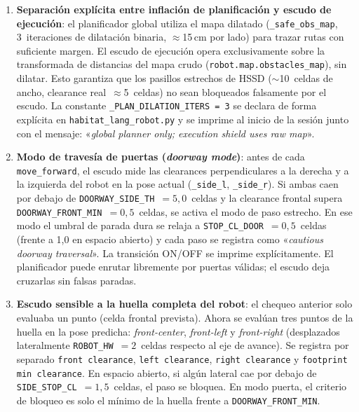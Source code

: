 \begin{enumerate}

  \item \textbf{Separación explícita entre inflación de planificación y escudo
        de ejecución}: el planificador global utiliza el mapa dilatado
        (\texttt{\_safe\_obs\_map}, 3~iteraciones de dilatación binaria,
        $\approx$15\,cm por lado) para trazar rutas con suficiente margen.
        El escudo de ejecución opera exclusivamente sobre la transformada de
        distancias del mapa crudo (\texttt{robot.map.obstacles\_map}), sin
        dilatar. Esto garantiza que los pasillos estrechos de HSSD
        ($\sim$10~celdas de ancho, clearance real~$\approx$5~celdas) no sean
        bloqueados falsamente por el escudo. La constante
        \texttt{\_PLAN\_DILATION\_ITERS = 3} se declara de forma explícita en
        \texttt{habitat\_lang\_robot.py} y se imprime al inicio de la sesión
        junto con el mensaje: «\textit{global planner only; execution shield
        uses raw map}».

  \item \textbf{Modo de travesía de puertas (\textit{doorway mode})}: antes de
        cada \texttt{move\_forward}, el escudo mide las clearances
        perpendiculares a la derecha y a la izquierda del robot en la pose
        actual (\texttt{\_side\_l}, \texttt{\_side\_r}). Si ambas caen por
        debajo de \texttt{DOORWAY\_SIDE\_TH}~$= 5{,}0$~celdas y la clearance
        frontal supera \texttt{DOORWAY\_FRONT\_MIN}~$= 0{,}5$~celdas, se
        activa el modo de paso estrecho. En ese modo el umbral de parada dura
        se relaja a \texttt{STOP\_CL\_DOOR}~$= 0{,}5$~celdas (frente a
        1{,}0 en espacio abierto) y cada paso se registra como
        «\textit{cautious doorway traversal}». La transición
        ON/OFF se imprime explícitamente. El planificador puede enrutar
        libremente por puertas válidas; el escudo deja cruzarlas sin falsas
        paradas.

  \item \textbf{Escudo sensible a la huella completa del robot}: el chequeo
        anterior solo evaluaba un punto (celda frontal prevista). Ahora se
        evalúan tres puntos de la huella en la pose predicha:
        \textit{front-center}, \textit{front-left} y \textit{front-right}
        (desplazados lateralmente \texttt{ROBOT\_HW}~$= 2$~celdas respecto
        al eje de avance). Se registra por separado
        \texttt{front clearance}, \texttt{left clearance},
        \texttt{right clearance} y \texttt{footprint min clearance}. En
        espacio abierto, si algún lateral cae por debajo de
        \texttt{SIDE\_STOP\_CL}~$= 1{,}5$~celdas, el paso se bloquea. En
        modo puerta, el criterio de bloqueo es solo el mínimo de la huella
        frente a \texttt{DOORWAY\_FRONT\_MIN}.


\end{enumerate}
